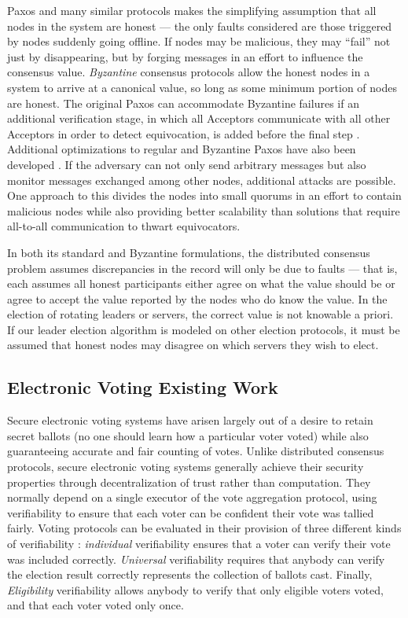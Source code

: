     Paxos and many similar protocols makes the simplifying assumption that all
    nodes in the system are honest --- the only faults considered are those
    triggered by nodes suddenly going offline. If nodes may be malicious, they
    may ``fail'' not just by disappearing, but by forging messages in an effort
    to influence the consensus value. \emph{Byzantine} consensus protocols allow
    the honest nodes in a system to arrive at a canonical value, so long as some
    minimum portion of nodes are honest. The original Paxos can
    accommodate Byzantine failures if an additional verification stage, in which
    all Acceptors communicate with all other Acceptors in order to detect
    equivocation, is added before the final step \cite{castro_practical_1999}.
    Additional optimizations to regular and Byzantine Paxos have also been
    developed \cite{lamport_fast_2006}. If the adversary can not only send
    arbitrary messages but also monitor messages exchanged among other nodes,
    additional attacks are possible. One approach to this divides the nodes into
    small quorums in an effort to contain malicious nodes \cite{king_load_2011}
    while also providing better scalability than solutions that require
    all-to-all communication to thwart equivocators.

    In both its standard and Byzantine formulations, the distributed consensus
    problem assumes discrepancies in the record will only be due to faults ---
    that is, each assumes all honest participants either agree on what the value
    should be or agree to accept the value reported by the nodes who do know the
    value.  In the election of rotating leaders or servers, the correct value is
    not knowable a priori. If our leader election algorithm is modeled on other
    election protocols, it must be assumed that honest nodes may disagree on
    which servers they wish to elect.

  \subsection{Electronic Voting Existing Work}
    Secure electronic voting systems have arisen largely out of a desire to
    retain secret ballots (no one should learn how a particular voter voted)
    while also guaranteeing accurate and fair counting of votes. Unlike
    distributed consensus protocols, secure electronic voting systems generally
    achieve their security properties through decentralization of trust rather
    than computation. They normally depend on a single executor of the vote
    aggregation protocol, using verifiability to ensure that each voter can be
    confident their vote was tallied fairly. Voting protocols can be evaluated
    in their provision of three different kinds of verifiability
    \cite{kremer_election_2010}: \emph{individual} verifiability ensures that a
    voter can verify their vote was included correctly. \emph{Universal}
    verifiability requires that anybody can verify the election result correctly
    represents the collection of ballots cast. Finally, \emph{Eligibility}
    verifiability allows anybody to verify that only eligible voters voted, and
    that each voter voted only once.

